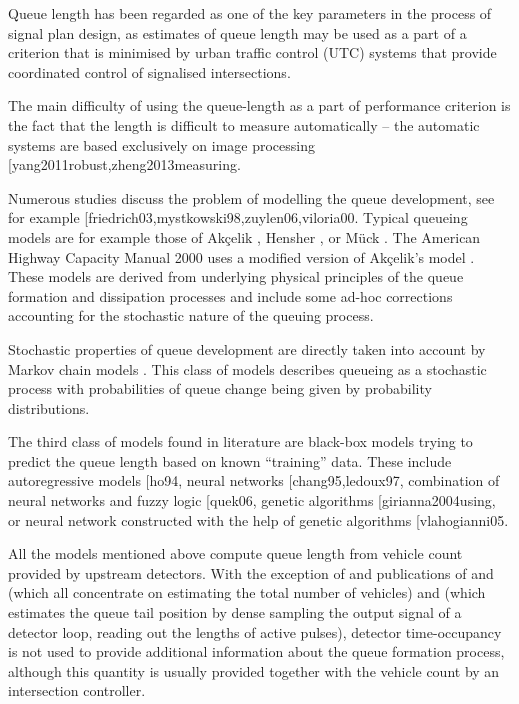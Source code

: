 \documentclass[twoside]{nnw}
\makeatletter
\def\citep{\@ifnextchar[{\@with}{\@without}}
\def\citet{\@ifnextchar[{\@with}{\@without}}
\def\@with[#1]#2{\cite[#1]{#2}}
\def\@without#1{\cite{#1}}
\makeatother
\begin{document}
Queue length has been regarded as one of the key parameters in the process of signal plan design, as estimates of queue length may be used as a part of a criterion that is minimised by urban traffic control (UTC) systems that provide coordinated control of signalised intersections.

The main difficulty of using the queue-length as a part of performance criterion is the fact that the length is difficult to measure automatically -- the automatic systems are based exclusively on image processing \citep{yang2011robust,zheng2013measuring}.

Numerous studies discuss the problem of modelling the queue development, see for example \citet{friedrich03,mystkowski98,zuylen06,viloria00}. Typical queueing models are for example those of Akçelik \cite{akcelik80}, Hensher \cite{hensher00}, or Mück \cite{mueck02}. The American Highway Capacity Manual 2000 uses a modified version of Akçelik's model \cite{hcm2000}.  These models are derived from underlying physical principles of the queue formation and dissipation processes and include some ad-hoc corrections accounting for the stochastic nature of the queuing process.

Stochastic properties of queue development are directly taken into account by Markov chain models
\cite{zuylen06,zuylen03,viti09a,viti2009dynamics}.
This class of models describes queueing as a stochastic process with probabilities of queue change being given by probability distributions.

The third class of models found in literature are black-box models trying to predict the queue length based on known ``training'' data. These include autoregressive models \citep{ho94}, neural networks \citep{chang95,ledoux97}, combination of neural networks and fuzzy logic \citep{quek06}, genetic algorithms \citep{girianna2004using}, or neural network constructed with the help of genetic algorithms \citep{vlahogianni05}.

All the models mentioned above compute queue length from vehicle count provided by upstream detectors. With the exception of \cite{diakaki99b} and publications of \cite{papageorgiou08a}
and \cite{vigos08a} (which all concentrate on estimating the total number of vehicles) and \cite{ma2012method} (which estimates the queue tail position by dense sampling the output signal of a detector loop, reading out the lengths of active pulses), detector time-occupancy is not used to provide additional information about the queue formation process, although this quantity is usually provided together with the vehicle count by an intersection controller.
\end{document}
